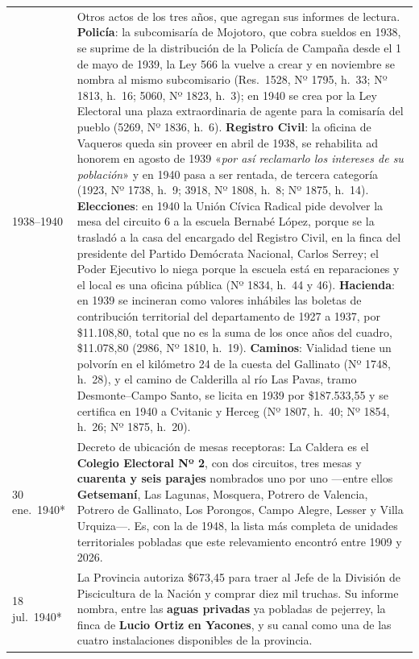 \begin{longtable}{@{}p{2.7cm}p{10.3cm}@{}}
1938--1940 & Otros actos de los tres años, que agregan sus informes de lectura. \textbf{Policía}: la subcomisaría de Mojotoro, que cobra sueldos en 1938, se suprime de la distribución de la Policía de Campaña desde el 1 de mayo de 1939, la Ley 566 la vuelve a crear y en noviembre se nombra al mismo subcomisario (Res.\ 1528, Nº 1795, h.\ 33; Nº 1813, h.\ 16; 5060, Nº 1823, h.\ 3); en 1940 se crea por la Ley Electoral una plaza extraordinaria de agente para la comisaría del pueblo (5269, Nº 1836, h.\ 6). \textbf{Registro Civil}: la oficina de Vaqueros queda sin proveer en abril de 1938, se rehabilita ad honorem en agosto de 1939 «\textit{por así reclamarlo los intereses de su población}» y en 1940 pasa a ser rentada, de tercera categoría (1923, Nº 1738, h.\ 9; 3918, Nº 1808, h.\ 8; Nº 1875, h.\ 14). \textbf{Elecciones}: en 1940 la Unión Cívica Radical pide devolver la mesa del circuito 6 a la escuela Bernabé López, porque se la trasladó a la casa del encargado del Registro Civil, en la finca del presidente del Partido Demócrata Nacional, Carlos Serrey; el Poder Ejecutivo lo niega porque la escuela está en reparaciones y el local es una oficina pública (Nº 1834, h.\ 44 y 46). \textbf{Hacienda}: en 1939 se incineran como valores inhábiles las boletas de contribución territorial del departamento de 1927 a 1937, por \$11.108,80, total que no es la suma de los once años del cuadro, \$11.078,80 (2986, Nº 1810, h.\ 19). \textbf{Caminos}: Vialidad tiene un polvorín en el kilómetro 24 de la cuesta del Gallinato (Nº 1748, h.\ 28), y el camino de Calderilla al río Las Pavas, tramo Desmonte--Campo Santo, se licita en 1939 por \$187.533,55 y se certifica en 1940 a Cvitanic y Herceg (Nº 1807, h.\ 40; Nº 1854, h.\ 26; Nº 1875, h.\ 20). \\
30 ene.\ 1940* & Decreto de ubicación de mesas receptoras: La Caldera es el \textbf{Colegio Electoral Nº 2}, con dos circuitos, tres mesas y \textbf{cuarenta y seis parajes} nombrados uno por uno ---entre ellos \textbf{Getsemaní}, Las Lagunas, Mosquera, Potrero de Valencia, Potrero de Gallinato, Los Porongos, Campo Alegre, Lesser y Villa Urquiza\index{Urquiza, Francisco S.}---. Es, con la de 1948, la lista más completa de unidades territoriales pobladas que este relevamiento encontró entre 1909 y 2026. \\
18 jul.\ 1940* & La Provincia autoriza \$673,45 para traer al Jefe de la División de Piscicultura de la Nación y comprar diez mil truchas. Su informe nombra, entre las \textbf{aguas privadas} ya pobladas de pejerrey, la finca de \textbf{Lucio Ortiz en Yacones}, y su canal como una de las cuatro instalaciones disponibles de la provincia. \\

\end{longtable}
